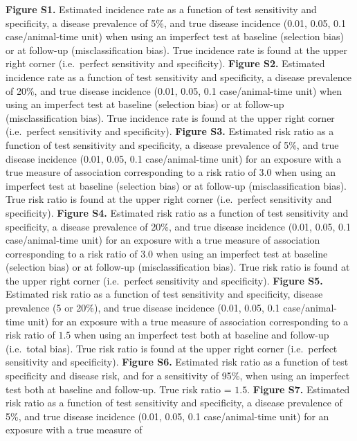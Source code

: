 \documentclass[utf8]{frontiersSCNS}\usepackage[]{graphicx}\usepackage[]{color}
\begin{document}
\textbf{Figure S1.} Estimated incidence rate as a function of test sensitivity
and specificity, a disease prevalence of 5\%, and true disease incidence (0.01,
0.05, 0.1 case/animal-time unit) when using an imperfect test at baseline
(selection bias) or at follow-up (misclassification bias). True incidence rate
is found at the upper right corner (i.e.\ perfect sensitivity and specificity).
\textbf{Figure S2.} Estimated incidence rate as a function of test sensitivity
and specificity, a disease prevalence of 20\%, and true disease incidence (0.01,
0.05, 0.1 case/animal-time unit) when using an imperfect test at baseline
(selection bias) or at follow-up (misclassification bias). True incidence rate
is found at the upper right corner (i.e.\ perfect sensitivity and specificity).
\textbf{Figure S3.} Estimated risk ratio as a function of test sensitivity and
specificity, a disease prevalence of 5\%, and true disease incidence (0.01,
0.05, 0.1 case/animal-time unit) for an exposure with a true measure of
association corresponding to a risk ratio of \(3.0\) when using an imperfect
test at baseline (selection bias) or at follow-up (misclassification bias). True
risk ratio is found at the upper right corner (i.e.\ perfect sensitivity and
specificity).
\textbf{Figure S4.} Estimated risk ratio as a function of test sensitivity and
specificity, a disease prevalence of 20\%, and true disease incidence (0.01,
0.05, 0.1 case/animal-time unit) for an exposure with a true measure of
association corresponding to a risk ratio of \(3.0\) when using an imperfect
test at baseline (selection bias) or at follow-up (misclassification bias). True
risk ratio is found at the upper right corner (i.e.\ perfect sensitivity and
specificity).
\textbf{Figure S5.} Estimated risk ratio as a function of test sensitivity and
specificity, disease prevalence (5 or 20\%), and true disease incidence (0.01,
0.05, 0.1 case/animal-time unit) for an exposure with a true measure of
association corresponding to a risk ratio of \(1.5\) when using an imperfect
test both at baseline and follow-up (i.e.\ total bias). True risk ratio is found
at the upper right corner (i.e.\ perfect sensitivity and specificity).
\textbf{Figure S6.} Estimated risk ratio as a function of test specificity and
disease risk, and for a sensitivity of 95\%, when using an imperfect test both
at baseline and follow-up. True risk ratio = \(1.5\).
\textbf{Figure S7.} Estimated risk ratio as a function of test sensitivity and
specificity, a disease prevalence of 5\%, and true disease incidence (0.01,
0.05, 0.1 case/animal-time unit) for an exposure with a true measure of
\end{document}
